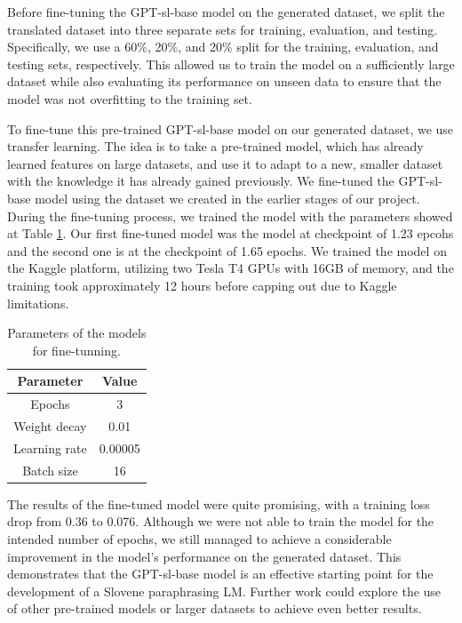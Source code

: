 \documentclass[fleqn,moreauthors,10pt]{ds_report}
\begin{document}
Before fine-tuning the GPT-sl-base model on the generated dataset, we split the translated dataset into three separate sets for training, evaluation, and testing. Specifically, we use a 60\%, 20\%, and 20\% split for the training, evaluation, and testing sets, respectively. This allowed us to train the model on a sufficiently large dataset while also evaluating its performance on unseen data to ensure that the model was not overfitting to the training set.

To fine-tune this pre-trained GPT-sl-base model on our generated dataset, we use transfer learning. The idea is to take a pre-trained model, which has already learned features on large datasets, and use it to adapt to a new, smaller dataset with the knowledge it has already gained previously. We fine-tuned the GPT-sl-base model using the dataset we created in the earlier stages of our project. During the fine-tuning process, we trained the model with the parameters showed at Table \ref{tab:parameters}. Our first fine-tuned model was the model at checkpoint of 1.23 epcohs and the second one is at the checkpoint of 1.65 epochs.  %
We trained the model on the Kaggle platform, utilizing two Tesla T4 GPUs with 16GB of memory, and the training took approximately 12 hours before capping out due to Kaggle limitations.

\begin{table}[!hbt]
    \centering
    \begin{tabular}{|c|c|}
    \hline
        Parameter & Value\\
        \hline\hline
        Epochs & 3 \\
        \hline
        Weight decay & 0.01 \\
        \hline
        Learning rate & 0.00005 \\
        \hline
        Batch size & 16\\
        \hline
    \end{tabular}
    \caption{Parameters of the models for fine-tunning.}
    \label{tab:parameters}
\end{table}
The results of the fine-tuned model were quite promising, with a training loss drop from 0.36 to 0.076. Although we were not able to train the model for the intended number of epochs, we still managed to achieve a considerable improvement in the model's performance on the generated dataset. This demonstrates that the GPT-sl-base model is an effective starting point for the development of a Slovene paraphrasing LM. Further work could explore the use of other pre-trained models or larger datasets to achieve even better results.
\end{document}
